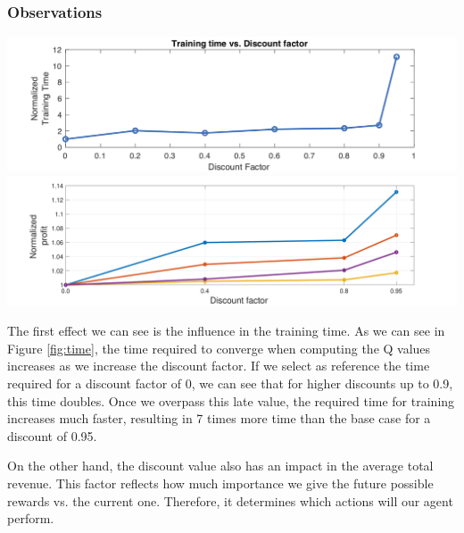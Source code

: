\documentclass[11pt]{article}
\begin{document}
\subsubsection{Observations}

\begin{minipage}[]{0.48\textwidth}

\includegraphics[width=\textwidth]{2-reactive/doc/plots/time-discount-2.png}
\label{fig:time}
\centering
\includegraphics[width=\textwidth]{2-reactive/doc/plots/variance-disc3.pdf}
\label{fig:variance}
\end{minipage}
\begin{minipage}[]{0.48\textwidth}
The first effect we can see is the influence in the training time. As we can see in Figure \ref{fig:time}, the time required to converge when computing the Q values increases as we increase the discount factor.
If we select as reference the time required for a discount factor of 0, we can see that for higher discounts up to 0.9, this time doubles. Once we overpass this late value, the required time for training increases much faster, resulting in 7 times more time than the base case for a discount of 0.95.

On the other hand, the discount value also has an impact in the average total revenue. This factor reflects how much importance we give the future possible rewards vs. the current one. Therefore, it determines which actions will our agent perform. 

\end{minipage}
\end{document}

